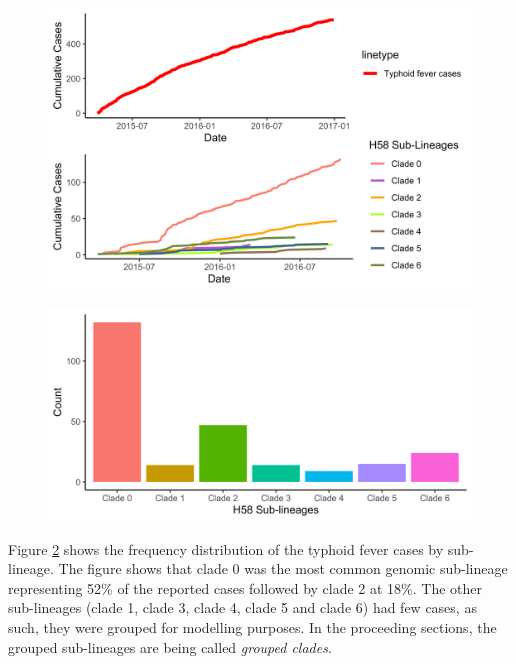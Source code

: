 \begin{figure}[H]
    \begin{center}
        \includegraphics[scale=0.8]{Cumulative Cases Over Time (All Cases) and Cumulative Cases Over Time By Sub-Lineage.png}
    \end{center}
    \label{fig:all-cumulative-cases}
\end{figure}

\begin{figure}[H]
    \begin{center}
        \includegraphics[scale=0.8]{Sub-lineage.png}
    \end{center}
    \label{fig:salmonella-frequency-distribution}
\end{figure}

Figure \ref{fig:salmonella-frequency-distribution} shows the frequency distribution of the typhoid fever cases by sub-lineage.
The figure shows that clade 0 was the most common genomic sub-lineage representing 52\% of the reported cases followed by clade 2 at 18\%.
The other sub-lineages (clade 1, clade 3, clade 4, clade 5 and clade 6) had few cases, as such, they were grouped for modelling purposes.
In the proceeding sections, the grouped sub-lineages are being called \emph{grouped clades}.

